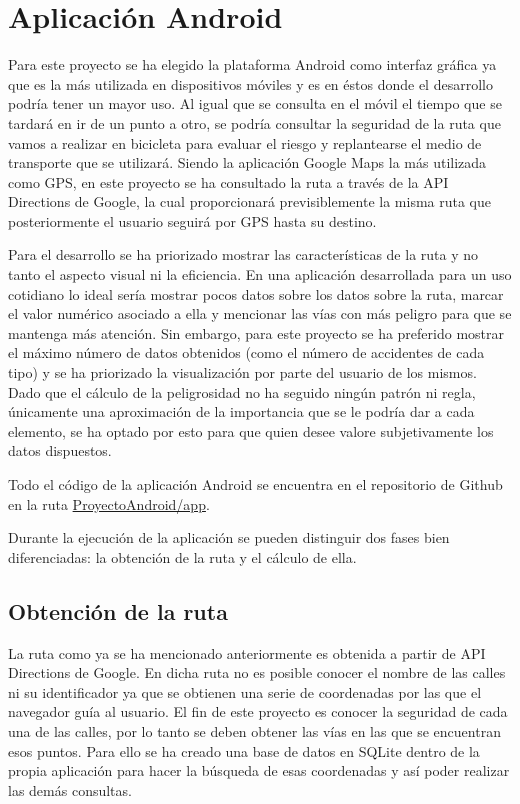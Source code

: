 \chapter{Aplicación Android}

Para este proyecto se ha elegido la plataforma Android como interfaz gráfica ya que es la más utilizada en dispositivos móviles y es en éstos donde el desarrollo podría tener un mayor uso.
Al igual que se consulta en el móvil el tiempo que se tardará en ir de un punto a otro, se podría consultar la seguridad de la ruta que vamos a realizar en bicicleta para evaluar el riesgo y replantearse el medio de transporte que se utilizará.
Siendo la aplicación Google Maps la más utilizada como GPS, en este proyecto se ha consultado la ruta a través de la API Directions de Google\cite{apiDirections}, la cual proporcionará previsiblemente la misma ruta que posteriormente el usuario seguirá por GPS hasta su destino.

Para el desarrollo se ha priorizado mostrar las características de la ruta y no tanto el aspecto visual ni la eficiencia. En una aplicación desarrollada para un uso cotidiano lo ideal sería mostrar pocos datos sobre los datos sobre la ruta, marcar el valor numérico asociado a ella y mencionar las vías con más peligro para que se mantenga más atención. Sin embargo, para este proyecto se ha preferido mostrar el máximo número de datos obtenidos (como el número de accidentes de cada tipo) y se ha priorizado la visualización por parte del usuario de los mismos. Dado que el cálculo de la peligrosidad no ha seguido ningún patrón ni regla, únicamente una aproximación de la importancia que se le podría dar a cada elemento, se ha optado por esto para que quien desee valore subjetivamente los datos dispuestos.

Todo el código de la aplicación Android se encuentra en el repositorio de Github \cite{githubRepositorio} en la ruta \url{ProyectoAndroid/app}.

Durante la ejecución de la aplicación se pueden distinguir dos fases bien diferenciadas: la obtención de la ruta y el cálculo de ella.









\clearpage
\section{Obtención de la ruta}
La ruta como ya se ha mencionado anteriormente es obtenida a partir de API Directions de Google. En dicha ruta no es posible conocer el nombre de las calles ni su identificador ya que se obtienen una serie de coordenadas por las que el navegador guía al usuario.
El fin de este proyecto es conocer la seguridad de cada una de las calles, por lo tanto se deben obtener las vías en las que se encuentran esos puntos. Para ello se ha creado una base de datos en SQLite dentro de la propia aplicación para hacer la búsqueda de esas coordenadas y así poder realizar las demás consultas.


